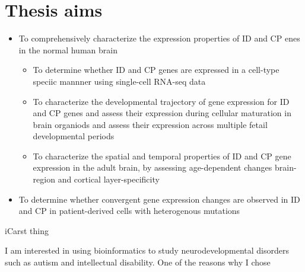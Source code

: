 \documentclass[12pt]{article}
\begin{document}
\section{Thesis aims}

\begin{itemize}
    \item To comprehensively characterize the expression properties of ID and CP enes in the normal human brain
    \begin{itemize}
        \item To determine whether ID and CP genes are expressed in a cell-type speciic mannner using single-cell RNA-seq data
        \item To characterize the developmental trajectory of gene expression for ID and CP genes and assess their expression during cellular maturation in brain organiods and assess their expression across multiple fetail developmental periods 
        \item  To characterize the spatial and temporal properties of ID and CP gene expression in the adult brain, by assessing age-dependent changes  brain-region and cortical layer-specificity 
        
    \end{itemize}

    \item To determine whether convergent gene expression changes are observed in ID and CP in patient-derived cells with heterogenous mutations 

\end{itemize}

iCarst thing 

I am interested in using bioinformatics to study neurodevelopmental disorders such as autism and intellectual disability. One of the reasons why I chose 
\end{document}
